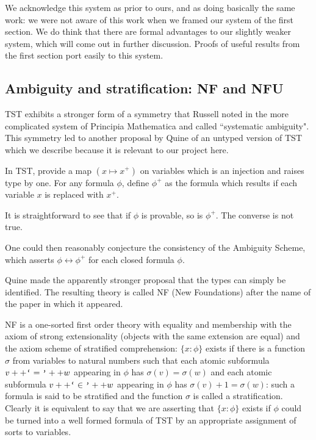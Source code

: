 \documentclass[12pt]{article}
\begin{document}
We acknowledge this system as prior to ours, and as doing basically the same work:  we were not aware of this work when we framed our system of the first section.  We do think that there are formal advantages to our slightly weaker system, which will come out in further discussion.  Proofs of useful results from the first section port easily to this system.


\subsection{Ambiguity and stratification:  NF and NFU}

TST exhibits a stronger form of a symmetry that Russell noted in the more complicated system of
Principia Mathematica and called ``systematic ambiguity".  This symmetry led to another proposal by Quine of an untyped version of TST which we describe because it is relevant to our project here.

In TST, provide a map $(x \mapsto x^+)$ on variables which is an injection and raises type by one.
For any formula $\phi$, define $\phi^+$ as the formula which results if each variable $x$ is replaced with $x^+$.

It is straightforward to see that if $\phi$ is provable, so is $\phi^+$.  The converse is not true.

One could then reasonably conjecture the consistency of the Ambiguity Scheme, which asserts
$\phi \leftrightarrow \phi^+$ for each closed formula $\phi$.

Quine made the apparently stronger proposal that the types can simply be identified.  The resulting theory is called NF (New Foundations) after the name of the paper in which it appeared.

NF is a one-sorted first order theory with equality and membership with the axiom of strong extensionality
(objects with the same extension are equal) and the axiom scheme of stratified comprehension:  $\{x:\phi\}$ exists if there is a function $\sigma$ from variables to natural numbers such that each atomic subformula
$v++\verb|`|=\verb|'|++w$ appearing in $\phi$ has $\sigma(v)=\sigma(w)$ and each atomic subformula
$v++\verb|`|\in\verb|'|++w$ appearing in $\phi$ has $\sigma(v)+1=\sigma(w)$: such a formula is said to be stratified and the function $\sigma$ is called a stratification.  Clearly it is equivalent to say that we are asserting that $\{x:\phi\}$ exists if $\phi$ could be turned into a well formed formula of TST by an appropriate assignment of sorts to variables.
\end{document}

